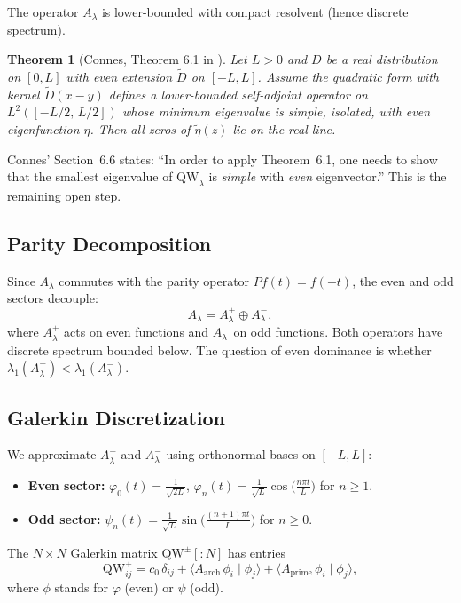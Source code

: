 \documentclass[12pt,a4paper]{article}
\newtheorem{theorem}{Theorem}[section]
\theoremstyle{definition}
\theoremstyle{remark}
\begin{document}
The operator $A_\lambda$ is lower-bounded with compact resolvent (hence discrete spectrum).

\begin{theorem}[Connes, Theorem 6.1 in \cite{Connes2025}]
\label{thm:connes}
Let $L > 0$ and $D$ be a real distribution on $[0,L]$ with even extension $\tilde{D}$ on $[-L,L]$. Assume the quadratic form with kernel $\tilde{D}(x-y)$ defines a lower-bounded self-adjoint operator on $L^2([-L/2,\,L/2])$ whose minimum eigenvalue is simple, isolated, with even eigenfunction $\eta$. Then all zeros of $\tilde{\eta}(z)$ lie on the real line.
\end{theorem}

\noindent Connes' Section~6.6 states: ``In order to apply Theorem~6.1, one needs to show that the smallest eigenvalue of $\mathrm{QW}_\lambda$ is \emph{simple} with \emph{even} eigenvector.'' This is the remaining open step.

\subsection{Parity Decomposition}

Since $A_\lambda$ commutes with the parity operator $Pf(t) = f(-t)$, the even and odd sectors decouple:
\[
A_\lambda = A_\lambda^+ \oplus A_\lambda^-,
\]
where $A_\lambda^+$ acts on even functions and $A_\lambda^-$ on odd functions. Both operators have discrete spectrum bounded below. The question of even dominance is whether $\lambda_1(A_\lambda^+) < \lambda_1(A_\lambda^-)$.

\subsection{Galerkin Discretization}

We approximate $A_\lambda^+$ and $A_\lambda^-$ using orthonormal bases on $[-L,L]$:
\begin{itemize}
  \item \textbf{Even sector:} $\varphi_0(t) = \frac{1}{\sqrt{2L}}$, \quad $\varphi_n(t) = \frac{1}{\sqrt{L}}\cos\!\bigl(\frac{n\pi t}{L}\bigr)$ for $n \geq 1$.
  \item \textbf{Odd sector:} $\psi_n(t) = \frac{1}{\sqrt{L}}\sin\!\bigl(\frac{(n+1)\pi t}{L}\bigr)$ for $n \geq 0$.
\end{itemize}
The $N \times N$ Galerkin matrix $\mathrm{QW}^{\pm}[{:}N]$ has entries
\[
\mathrm{QW}^{\pm}_{ij} = c_0\,\delta_{ij} + \langle A_{\mathrm{arch}}\,\phi_i \mid \phi_j \rangle + \langle A_{\mathrm{prime}}\,\phi_i \mid \phi_j \rangle,
\]
where $\phi$ stands for $\varphi$ (even) or $\psi$ (odd).
\end{document}

